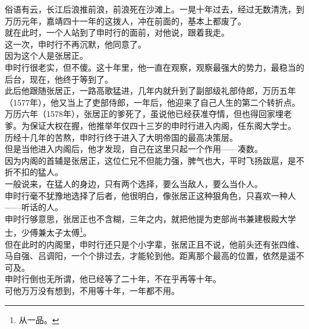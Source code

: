 \begin{multicols}{\theparacolNo}
俗语有云，长江后浪推前浪，前浪死在沙滩上。一晃十年过去，经过无数清洗，到万历元年，嘉靖四十一年的这拨人，冲在前面的，基本上都废了。\\

就在此时，一个人站到了申时行的面前，对他说，跟着我走。\\

这一次，申时行不再沉默，他同意了。\\

因为这个人是张居正。\\

申时行很老实，但不傻。这十年里，他一直在观察，观察最强大的势力，最稳当的后台，现在，他终于等到了。\\

此后他跟随张居正，一路高歌猛进，几年内就升到了副部级礼部侍郎，万历五年（1577年），他又当上了吏部侍郎，一年后，他迎来了自己人生的第二个转折点。\\

万历六年（1578年），张居正的爹死了，虽说他已经获准夺情，但也得回家埋老爹。为保证大权在握，他推举年仅四十三岁的申时行进入内阁，任东阁大学士。\\

历经十几年的苦熬，申时行终于进入了大明帝国的最高决策层。\\

但是当他进入内阁后，他才发现，自己在这里只起一个作用——凑数。\\

因为内阁的首辅是张居正，这位仁兄不但能力强，脾气也大，平时飞扬跋扈，是不折不扣的猛人。\\

一般说来，在猛人的身边，只有两个选择，要么当敌人，要么当仆人。\\

申时行毫不犹豫地选择了后者，他很明白，像张居正这种狠角色，只喜欢一种人——听话的人。\\

申时行够意思，张居正也不含糊，三年之内，就把他提为吏部尚书兼建极殿大学士，少傅兼太子太傅\footnote{从一品。}。\\

但在此时的内阁里，申时行还只是个小字辈，张居正且不说，他前头还有张四维、马自强、吕调阳，一个个排过去，才能轮到他。距离那个最高的位置，依然是遥不可及。\\

申时行倒也无所谓，他已经等了二十年，不在乎再等十年。\\

可他万万没有想到，不用等十年，一年都不用。\\


\end{multicols}
